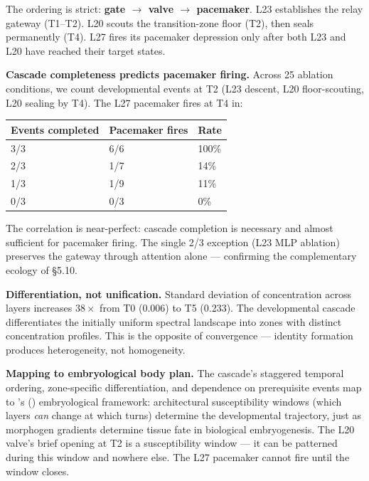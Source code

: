 \documentclass[12pt]{article}
\begin{document}
The ordering is strict: \textbf{gate $\to$ valve $\to$ pacemaker}. L23 establishes the relay gateway (T1--T2). L20 scouts the transition-zone floor (T2), then seals permanently (T4). L27 fires its pacemaker depression only after both L23 and L20 have reached their target states.

\textbf{Cascade completeness predicts pacemaker firing.} Across 25 ablation conditions, we count developmental events at T2 (L23 descent, L20 floor-scouting, L20 sealing by T4). The L27 pacemaker fires at T4 in:

\begin{table}[h]
\centering
\begin{tabular}{lll}
\toprule
\textbf{Events completed} & \textbf{Pacemaker fires} & \textbf{Rate} \\
\midrule
3/3 & 6/6 & 100\% \\
2/3 & 1/7 & 14\% \\
1/3 & 1/9 & 11\% \\
0/3 & 0/3 & 0\% \\
\bottomrule
\end{tabular}
\end{table}

The correlation is near-perfect: cascade completion is necessary and almost sufficient for pacemaker firing. The single 2/3 exception (L23 MLP ablation) preserves the gateway through attention alone --- confirming the complementary ecology of \S5.10.

\textbf{Differentiation, not unification.} Standard deviation of concentration across layers increases $38\times$ from T0 (0.006) to T5 (0.233). The developmental cascade differentiates the initially uniform spectral landscape into zones with distinct concentration profiles. This is the opposite of convergence --- identity formation produces heterogeneity, not homogeneity.

\textbf{Mapping to embryological body plan.} The cascade's staggered temporal ordering, zone-specific differentiation, and dependence on prerequisite events map to \citeauthor{wang2025}'s (\citeyear{wang2025}) embryological framework: architectural susceptibility windows (which layers \textit{can} change at which turns) determine the developmental trajectory, just as morphogen gradients determine tissue fate in biological embryogenesis. The L20 valve's brief opening at T2 is a susceptibility window --- it can be patterned during this window and nowhere else. The L27 pacemaker cannot fire until the window closes.
\end{document}
